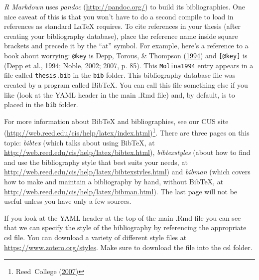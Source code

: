 \documentclass[12pt,twoside]{reedthesis}
\begin{document}
\emph{R Markdown} uses \emph{pandoc} (\url{http://pandoc.org/}) to build its bibliographies. One nice caveat of this is that you won't have to do a second compile to load in references as standard LaTeX requires. To cite references in your thesis (after creating your bibliography database), place the reference name inside square brackets and precede it by the ``at'' symbol. For example, here's a reference to a book about worrying: \texttt{@key} is Depp, Torous, \& Thompson (\protect\hyperlink{ref-Molina1994}{1994}) and \texttt{{[}@key{]}} is (Depp et al., \protect\hyperlink{ref-Molina1994}{1994}; Noble, \protect\hyperlink{ref-noble2002}{2002}; \protect\hyperlink{ref-reedweb2007}{2007}, p. 85). This \texttt{Molina1994} entry appears in a file called \texttt{thesis.bib} in the \texttt{bib} folder. This bibliography database file was created by a program called BibTeX. You can call this file something else if you like (look at the YAML header in the main .Rmd file) and, by default, is to placed in the \texttt{bib} folder.

For more information about BibTeX and bibliographies, see our CUS site (\url{http://web.reed.edu/cis/help/latex/index.html})\footnote{Reed~College (\protect\hyperlink{ref-reedweb2007}{2007})}. There are three pages on this topic: \emph{bibtex} (which talks about using BibTeX, at \url{http://web.reed.edu/cis/help/latex/bibtex.html}), \emph{bibtexstyles} (about how to find and use the bibliography style that best suits your needs, at \url{http://web.reed.edu/cis/help/latex/bibtexstyles.html}) and \emph{bibman} (which covers how to make and maintain a bibliography by hand, without BibTeX, at \url{http://web.reed.edu/cis/help/latex/bibman.html}). The last page will not be useful unless you have only a few sources.

If you look at the YAML header at the top of the main .Rmd file you can see that we can specify the style of the bibliography by referencing the appropriate csl file. You can download a variety of different style files at \url{https://www.zotero.org/styles}. Make sure to download the file into the csl folder.
\end{document}
